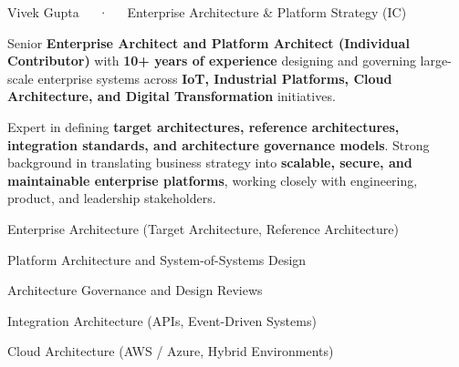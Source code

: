 \documentclass[11pt, a4paper]{awesome-cv}
\begin{document}
\makecvheader[C]

\makecvfooter
  {}
  {Vivek Gupta~~~·~~~Enterprise Architecture \& Platform Strategy (IC)}
  {\thepage}

\vspace{-1.0em}

\begin{cvparagraph}
Senior \textbf{Enterprise Architect and Platform Architect (Individual Contributor)}
with \textbf{10+ years of experience} designing and governing large-scale
enterprise systems across \textbf{IoT, Industrial Platforms, Cloud Architecture,
and Digital Transformation} initiatives.

Expert in defining \textbf{target architectures, reference architectures,
integration standards, and architecture governance models}.
Strong background in translating business strategy into \textbf{scalable,
secure, and maintainable enterprise platforms}, working closely with engineering,
product, and leadership stakeholders.
\end{cvparagraph}


\vspace{-0.6em}
\begin{cvitems}
  \item {Enterprise Architecture (Target Architecture, Reference Architecture)}
  \item {Platform Architecture and System-of-Systems Design}
  \item {Architecture Governance and Design Reviews}
  \item {Integration Architecture (APIs, Event-Driven Systems)}
  \item {Cloud Architecture (AWS / Azure, Hybrid Environments)}
\end{cvitems}

\vspace{-0.5em}
\end{document}
